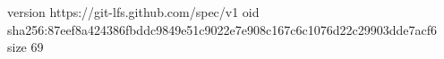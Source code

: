 version https://git-lfs.github.com/spec/v1
oid sha256:87eef8a424386fbddc9849e51c9022e7e908c167c6c1076d22c29903dde7acf6
size 69
